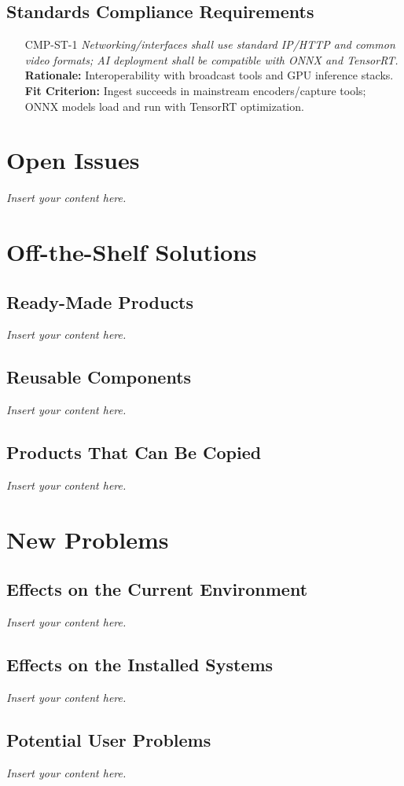 \documentclass[12pt]{article}
\newcommand{\lips}{\textit{Insert your content here.}}
\begin{document}
\subsection{Standards Compliance Requirements}
\begin{itemize}[leftmargin=*]
  \item[CMP-ST-1] \emph{Networking/interfaces shall use standard IP/HTTP and common
          video formats; AI deployment shall be compatible with ONNX and TensorRT.}\\
        \textbf{Rationale:} Interoperability with broadcast tools and GPU inference
        stacks.\\ \textbf{Fit Criterion:} Ingest succeeds in mainstream
        encoders/capture tools; ONNX models load and run with TensorRT optimization.
\end{itemize}

\section{Open Issues}
\lips

\section{Off-the-Shelf Solutions}
\subsection{Ready-Made Products}
\lips
\subsection{Reusable Components}
\lips
\subsection{Products That Can Be Copied}
\lips

\section{New Problems}
\subsection{Effects on the Current Environment}
\lips
\subsection{Effects on the Installed Systems}
\lips
\subsection{Potential User Problems}
\lips
\end{document}
